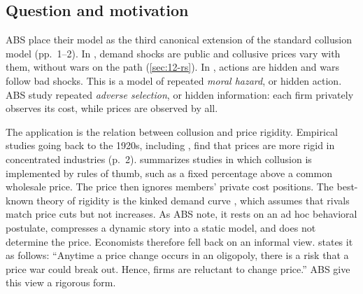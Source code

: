 \subsection{Question and motivation}\label{sec:12-abs-question}

ABS place their model as the third canonical extension of the standard collusion model (pp.~1--2). In
\citet{RotembergSaloner1986}, demand shocks are public and collusive prices vary with them, without wars on the
path (\cref{sec:12-rs}). In \citet{GreenPorter1984}, actions are hidden and wars follow bad shocks. This is a model of
repeated \emph{moral hazard}, or hidden action. ABS study repeated \emph{adverse selection}, or hidden information:
each firm privately observes its cost, while prices are observed by all.

The application is the relation between collusion and price rigidity. Empirical studies going back to the 1920s,
including \citet{Carlton1986,Carlton1989}, find that prices are more rigid in concentrated industries (p.~2).
\citet{Scherer1980} summarizes studies in which collusion is implemented by rules of thumb, such as a fixed
percentage above a common wholesale price. The price then ignores members' private cost positions. The best-known
theory of rigidity is the kinked demand curve \citep{Sweezy1939,HallHitch1939}, which assumes that rivals match price
cuts but not increases. As ABS note, it rests on an ad hoc behavioral postulate, compresses a dynamic story into a
static model, and does not determine the price. Economists therefore fell back on an informal view.
\citet[pp.~914--915]{Carlton1989} states it as follows: ``Anytime a price change occurs in an oligopoly, there is a risk
that a price war could break out. Hence, firms are reluctant to change price.'' ABS give this view a rigorous form.

